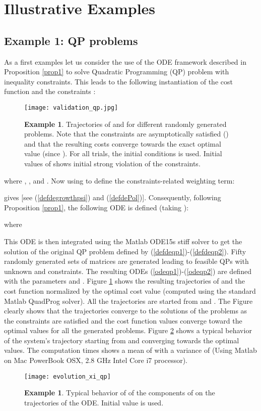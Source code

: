 \documentclass{article}
\begin{document}
\section{Illustrative Examples} \label{secexamples} 
\subsection{Example 1: QP problems}
\noindent As a first examples let us consider the use of the ODE framework described in Proposition \ref{prop1} to solve Quadratic Programming (QP) problem with inequality constraints. This leads to the following instantiation of the cost function  and the constraints : 
  
\begin{figure}
\begin{center}
\texttt{[image: validation\_qp.jpg]}
\end{center}
\caption{{\bf Example 1}. Trajectories of  and  for  different randomly generated problems. Note that the constraints are asymptotically satisfied () and that the resulting costs converge towards the exact optimal value  (since ). For all trials, the initial conditions  is used. Initial values of  shows initial strong violation of the constraints.} \label{validation_qp} 
\end{figure}
where , ,  and . Now using  to define the constraints-related weighting term:
 
gives  [see (\ref{defdegrowthpsi}) and (\ref{defdePol})]. Consequently, following Proposition \ref{prop1}, the following ODE is defined (taking ):
  
where 
 
This ODE is then integrated using the Matlab ODE15s stiff solver to get the solution of the original QP problem defined by (\ref{defdeqp1})-(\ref{defdeqp2}). Fifty randomly generated sets of matrices  are generated leading to  feasible QPs with  unknown and  constraints. The resulting ODEs (\ref{odeqp1})-(\ref{odeqp2}) are defined with the parameters  and . Figure \ref{validation_qp} shows the resulting trajectories of  and the cost function normalized by the optimal cost value (computed using the standard Matlab QuadProg solver). All the trajectories are started from  and . The Figure clearly shows that the trajectories converge to the solutions of the problems as the constraints are satisfied and the cost function values converge toward the optimal values for all the generated problems. 
Figure \ref{evolution_xi_qp} shows a typical behavior of the system's trajectory starting from  and converging towards the optimal values. The computation times shows a mean of  with a variance of  (Using Matlab on Mac PowerBook OSX, 2.8 GHz Intel Core i7 processor).
\begin{figure}
\begin{center}
\texttt{[image: evolution\_xi\_qp]}
\end{center} 
\caption{{\bf Example 1}. Typical behavior of of the components of  on the trajectories of the ODE. Initial value  is used.}\label{evolution_xi_qp}
\end{figure}
\end{document}
